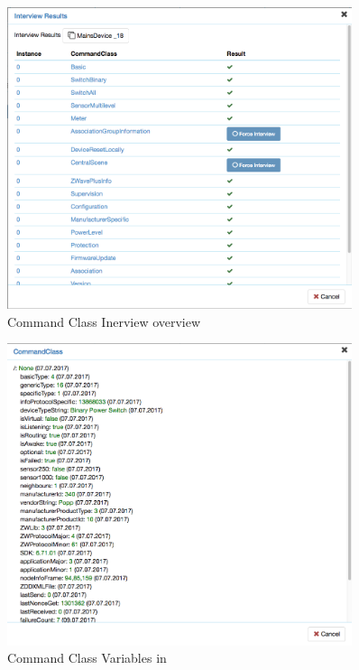 \begin{figure}
\begin{center}
\includegraphics[width=0.9\textwidth]{pngs/cap11/dev1.png}
\caption{Command Class Inerview overview}
\label{dev1}
\end{center}
\end{figure}


\begin{figure}
\begin{center}
\includegraphics[width=0.9\textwidth]{pngs/cap11/dev2.png}
\caption{Command Class Variables in \zweui}
\label{dev2}
\end{center}
\end{figure}

